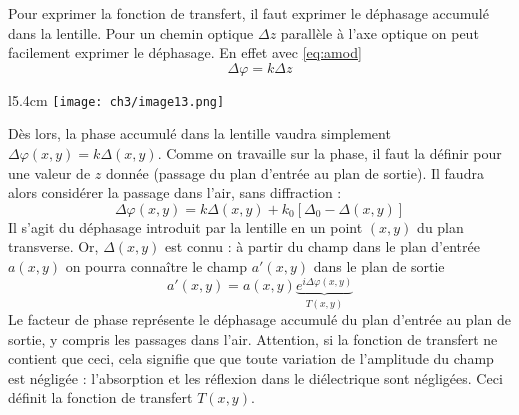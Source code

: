 	Pour exprimer la fonction de transfert, il faut exprimer le déphasage accumulé dans la lentille. Pour 
	un chemin optique $\Delta z$ parallèle à l'axe optique on peut facilement exprimer le déphasage. En effet 
	avec \autoref{eq:amod} 
	\begin{equation}
	\Delta\varphi = k\Delta z
	\end{equation}
	\begin{wrapfigure}[12]{l}{5.4cm}
	\texttt{[image: ch3/image13.png]}
	\end{wrapfigure}		
	Dès lors, la phase accumulé dans la lentille vaudra simplement $\Delta \varphi(x,y) = k\Delta (x,y)$. 
	Comme on travaille sur la phase, il faut la définir pour une valeur de $z$ donnée (passage du plan 
	d'entrée au 	plan de sortie). Il faudra alors considérer la passage dans l'air, sans diffraction :
	\begin{equation}
	\Delta \varphi(x,y) = k\Delta (x,y) + k_0[\Delta_0-\Delta(x,y)]
	\end{equation}
	Il s'agit du déphasage introduit par la lentille en un point $(x,y)$ du plan transverse. Or, 
	$\Delta(x,y)$ est connu : à partir du champ dans le plan d'entrée $a(x,y)$ on pourra connaître le 
	champ $a'(x,y)$	dans le plan de sortie 
	\begin{equation}
	a'(x,y) = a(x,y)\underbrace{e^{i\Delta\varphi(x,y)}}_{T(x,y)}
	\end{equation}
	Le facteur de phase représente le déphasage accumulé du plan d'entrée au plan de sortie, y compris les 
	passages dans l'air. Attention, si la fonction de transfert ne contient que ceci, cela signifie que 
	que toute variation de l'amplitude du champ est négligée : l’absorption et les réflexion dans le 
	diélectrique sont négligées. Ceci définit la fonction de transfert $T(x,y)$.\\
	
